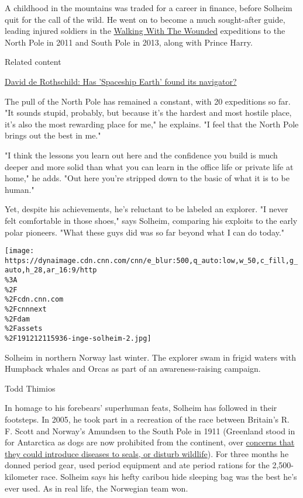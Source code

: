 A childhood in the mountains was traded for a career in finance, before
Solheim quit for the call of the wild. He went on to become a much
sought-after guide, leading injured soldiers in the
\href{https://walkingwiththewounded.org.uk/Home/About/63}{Walking With
The Wounded} expeditions to the North Pole in 2011 and South Pole in
2013, along with Prince Harry.

Related content

\href{/2019/10/08/world/david-de-rothschild-modern-explorers/index.html}{David
de Rothschild: Has 'Spaceship Earth' found its navigator?}

The pull of the North Pole has remained a constant, with 20 expeditions
so far. "It sounds stupid, probably, but because it's the hardest and
most hostile place, it's also the most rewarding place for me," he
explains. "I feel that the North Pole brings out the best in me."

"I think the lessons you learn out here and the confidence you build is
much deeper and more solid than what you can learn in the office life or
private life at home," he adds. "Out here you're stripped down to the
basic of what it is to be human."

Yet, despite his achievements, he's reluctant to be labeled an explorer.
"I never felt comfortable in those shoes," says Solheim, comparing his
exploits to the early polar pioneers. "What these guys did was so far
beyond what I can do today."

\texttt{[image: https://dynaimage.cdn.cnn.com/cnn/e\_blur:500,q\_auto:low,w\_50,c\_fill,g\_auto,h\_28,ar\_16:9/http\\\%3A\\\%2F\\\%2Fcdn.cnn.com\\\%2Fcnnnext\\\%2Fdam\\\%2Fassets\\\%2F191212115936-inge-solheim-2.jpg]}

Solheim in northern Norway last winter. The explorer swam in frigid
waters with Humpback whales and Orcas as part of an awareness-raising
campaign.

Todd Thimios

In homage to his forebears' superhuman feats, Solheim has followed in
their footsteps. In 2005, he took part in a recreation of the race
between Britain's R. F. Scott and Norway's Amundsen to the South Pole in
1911 (Greenland stood in for Antarctica as dogs are now prohibited from
the continent, over
\href{https://www.bas.ac.uk/about/antarctica/environmental-protection/wildlife-and-plants-2/removal-of-the-sledge-dogs/}{concerns
that they could introduce diseases to seals, or disturb wildlife}). For
three months he donned period gear, used period equipment and ate period
rations for the 2,500-kilometer race. Solheim says his hefty caribou
hide sleeping bag was the best he's ever used. As in real life, the
Norwegian team won.


